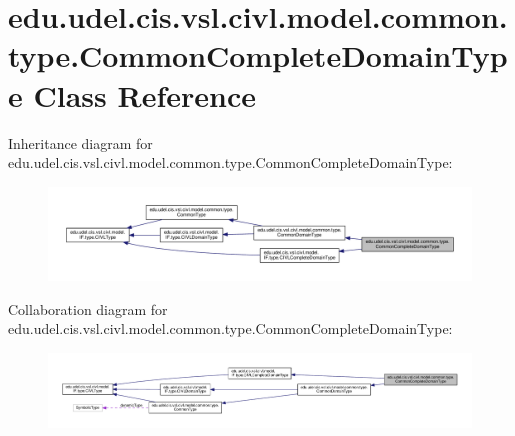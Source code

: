 \hypertarget{classedu_1_1udel_1_1cis_1_1vsl_1_1civl_1_1model_1_1common_1_1type_1_1CommonCompleteDomainType}{}\section{edu.\+udel.\+cis.\+vsl.\+civl.\+model.\+common.\+type.\+Common\+Complete\+Domain\+Type Class Reference}
\label{classedu_1_1udel_1_1cis_1_1vsl_1_1civl_1_1model_1_1common_1_1type_1_1CommonCompleteDomainType}


Inheritance diagram for edu.\+udel.\+cis.\+vsl.\+civl.\+model.\+common.\+type.\+Common\+Complete\+Domain\+Type\+:
\nopagebreak
\begin{figure}[H]
\begin{center}
\leavevmode
\includegraphics[width=350pt]{classedu_1_1udel_1_1cis_1_1vsl_1_1civl_1_1model_1_1common_1_1type_1_1CommonCompleteDomainType__inherit__graph}
\end{center}
\end{figure}


Collaboration diagram for edu.\+udel.\+cis.\+vsl.\+civl.\+model.\+common.\+type.\+Common\+Complete\+Domain\+Type\+:
\nopagebreak
\begin{figure}[H]
\begin{center}
\leavevmode
\includegraphics[width=350pt]{classedu_1_1udel_1_1cis_1_1vsl_1_1civl_1_1model_1_1common_1_1type_1_1CommonCompleteDomainType__coll__graph}
\end{center}
\end{figure}
